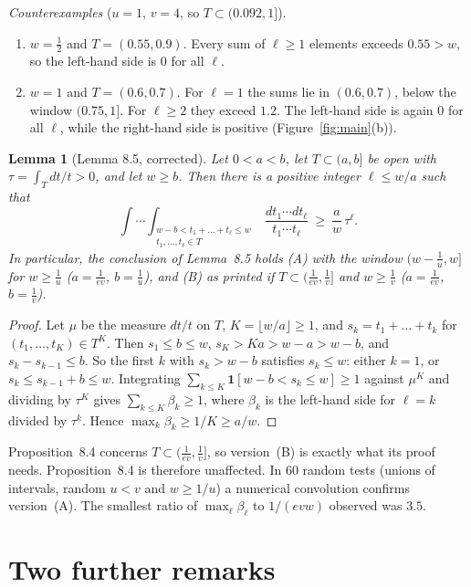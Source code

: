\documentclass[11pt,a4paper]{amsart}
\newtheorem{lemma}[theorem]{Lemma}
\theoremstyle{remark}
\begin{document}
\emph{Counterexamples} ($u=1$, $v=4$, so $T\subset(0.092,1]$).
\begin{enumerate}
\item[(a)] $w=\frac12$ and $T=(0.55,0.9)$. Every sum of $\ell\ge1$ elements exceeds $0.55>w$, so the
left-hand side is $0$ for all $\ell$.
\item[(b)] $w=1$ and $T=(0.6,0.7)$. For $\ell=1$ the sums lie in $(0.6,0.7)$, below the window
$(0.75,1]$. For $\ell\ge2$ they exceed $1.2$. The left-hand side is again $0$ for all $\ell$, while the
right-hand side is positive (Figure~\ref{fig:main}(b)).
\end{enumerate}

\begin{lemma}[Lemma 8.5, corrected]\label{lem:85}
Let $0<a<b$, let $T\subset(a,b]$ be open with $\tau=\int_T dt/t>0$, and let $w\ge b$. Then there is a positive
integer $\ell\le w/a$ such that
\[
\int\!\!\cdots\!\!\int_{\substack{w-b<t_1+\dots+t_\ell\le w\\ t_1,\dots,t_\ell\in T}}\frac{dt_1\cdots dt_\ell}{t_1\cdots t_\ell}\ \ge\ \frac aw\,\tau^\ell .
\]
In particular, the conclusion of Lemma~8.5 holds (A) with the window $(w-\frac1u,w]$ for $w\ge\frac1u$
($a=\frac1{ev}$, $b=\frac1u$), and (B) as printed if $T\subset(\frac1{ev},\frac1v]$ and $w\ge\frac1v$
($a=\frac1{ev}$, $b=\frac1v$).
\end{lemma}

\begin{proof}
Let $\mu$ be the measure $dt/t$ on $T$, $K=\lfloor w/a\rfloor\ge1$, and $s_k=t_1+\dots+t_k$ for
$(t_1,\dots,t_K)\in T^K$. Then $s_1\le b\le w$, $s_K>Ka>w-a>w-b$, and $s_k-s_{k-1}\le b$. So the first
$k$ with $s_k>w-b$ satisfies $s_k\le w$: either $k=1$, or $s_k\le s_{k-1}+b\le w$. Integrating
$\sum_{k\le K}\mathbf 1[w-b<s_k\le w]\ge1$ against $\mu^K$ and dividing by $\tau^K$ gives $\sum_{k\le K}\beta_k\ge1$, where $\beta_k$
is the left-hand side for $\ell=k$ divided by $\tau^k$. Hence $\max_k\beta_k\ge1/K\ge a/w$.
\end{proof}

Proposition~8.4 concerns $T\subset(\frac1{ev},\frac1v]$, so version~(B) is exactly what its proof needs.
Proposition~8.4 is therefore unaffected. In $60$ random tests (unions of intervals, random $u<v$ and
$w\ge1/u$) a numerical convolution confirms version~(A). The smallest ratio of $\max_\ell\beta_\ell$ to
$1/(evw)$ observed was $3.5$.

\section{Two further remarks}\label{sec:further}
\end{document}
